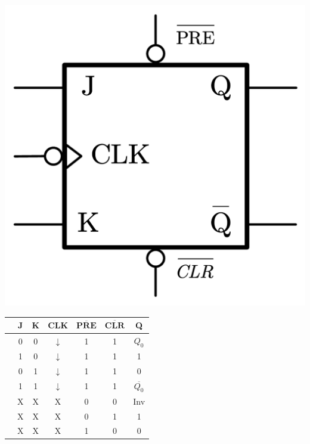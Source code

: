 \documentclass[a4paper, 11pt, oneside]{article}
\begin{document}
\vspace{0.7cm}

\begin{minipage}{\textwidth}
    \begin{minipage}[b]{0.49\textwidth}
        \centering
        \includegraphics[scale=0.25]{Graphics/Practice 2/GRAPHICS/LOGIC GATES/JK ASYNCH.pdf}
        \label{fig:JK_Asynch}
    \end{minipage}
    \hfill
    \begin{minipage}[b]{0.49\textwidth}
        \centering
            \begin{tabular}[t]{lcccccc}
                \toprule
                & \textbf{J} & \textbf{K} & \textbf{CLK} & $\overline{\mathbf{PRE}}$ & $\overline{\mathbf{CLR}}$ & \textbf{Q}\\
                \midrule
                & 0 & 0 & $\downarrow$ & 1 & 1 & $Q_0$\\
                & 1 & 0 & $\downarrow$ & 1 & 1 & 1\\
                & 0 & 1 & $\downarrow$ & 1 & 1 & 0\\
                & 1 & 1 & $\downarrow$ & 1 & 1 & $\overline{Q_0}$\\
                \midrule
                & X & X & X & 0 & 0 & Inv\\
                & X & X & X & 0 & 1 & 1\\
                & X & X & X & 1 & 0 & 0\\
                \bottomrule
            \end{tabular}
        \label{table:JK_Asynch_TT}
    \end{minipage}
\end{minipage}\textbf{}
\end{document}
